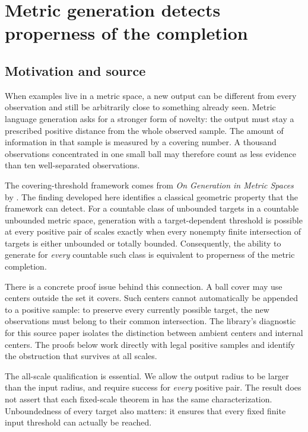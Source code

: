 \section{Metric generation detects properness of the completion}
\label{mt:chapter}

\subsection{Motivation and source}
When examples live in a metric space, a new output can be different from every observation and still be arbitrarily close to something already seen. Metric language generation asks for a stronger form of novelty: the output must stay a prescribed positive distance from the whole observed sample. The amount of information in that sample is measured by a covering number. A thousand observations concentrated in one small ball may therefore count as less evidence than ten well-separated observations.

The covering-threshold framework comes from \emph{On Generation in Metric Spaces} by \citet{P21}. The finding developed here identifies a classical geometric property that the framework can detect. For a countable class of unbounded targets in a countable unbounded metric space, generation with a target-dependent threshold is possible at every positive pair of scales exactly when every nonempty finite intersection of targets is either unbounded or totally bounded. Consequently, the ability to generate for \emph{every} countable such class is equivalent to properness of the metric completion.

There is a concrete proof issue behind this connection. A ball cover may use centers outside the set it covers. Such centers cannot automatically be appended to a positive sample: to preserve every currently possible target, the new observations must belong to their common intersection. The library's diagnostic for this source paper isolates the distinction between ambient centers and internal centers. The proofs below work directly with legal positive samples and identify the obstruction that survives at all scales.

The all-scale qualification is essential. We allow the output radius to be larger than the input radius, and require success for \emph{every} positive pair. The result does not assert that each fixed-scale theorem in \citet{P21} has the same characterization. Unboundedness of every target also matters: it ensures that every fixed finite input threshold can actually be reached.

